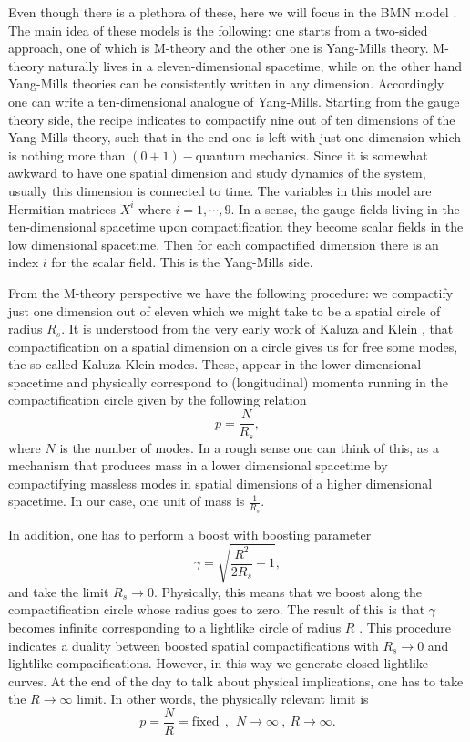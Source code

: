 \documentclass[11pt,english]{article}
\newcommand{\be}{\begin{equation}}
\newcommand{\ee}{\end{equation}}
\def\nn{\nonumber}
\numberwithin{equation}{section}
\begin{document}
Even though there is a plethora of these, here we will focus in the BMN model \cite{Berenstein2002}. The main idea of these models is the following: one starts from a two-sided approach, one of which is M-theory and the other one is Yang-Mills theory. M-theory naturally lives in a eleven-dimensional spacetime, while on the other hand Yang-Mills theories can be consistently written in any dimension. Accordingly one can write a ten-dimensional analogue of Yang-Mills. Starting from the gauge theory side, the recipe indicates to compactify nine out of ten dimensions of the Yang-Mills theory, such that in the end one is left with just one dimension which is nothing more than $(0+1)-$quantum mechanics. Since it is somewhat awkward to have one spatial dimension and study dynamics of the system, usually this dimension is connected to time.  The variables in this model are Hermitian matrices $X^i$ where $i=1,\cdots,9$. In a sense, the gauge fields living in the ten-dimensional spacetime upon compactification they become scalar fields in the low dimensional spacetime. Then for each compactified dimension there is an index $i$ for the scalar field.  This is the Yang-Mills side. 

From the M-theory perspective we have the following procedure: we compactify just one dimension out of eleven which we might take to be a spatial circle of radius $R_s$. It is understood from the very early work of Kaluza \cite{Kaluza} and Klein \cite{Klein}, that compactification on a spatial dimension on a circle gives us for free some modes, the so-called Kaluza-Klein modes. These, appear in the lower dimensional spacetime and physically correspond to (longitudinal) momenta running in the compactification circle given by the following relation
\be\nn 
p=\frac{N}{R_s},
\ee   
where $N$ is the number of modes. In a rough sense one can think of this, as a mechanism that produces mass in a lower dimensional spacetime by compactifying massless modes in spatial dimensions of a higher dimensional spacetime. In our case, one unit of mass is $\frac{1}{R_s}$.

In addition, one has to perform a boost with boosting parameter 
\be 
\gamma=\sqrt{\frac{R^2}{2R_s}+1},
\ee
and take the limit $R_s\to 0$. Physically, this means that we boost along the compactification circle whose radius goes to zero.  The result of this is that $\gamma$ becomes infinite corresponding to a lightlike circle of radius $R$ \cite{Seiberg1997}. This procedure indicates a duality between boosted spatial compactifications with $R_s\to 0$ and lightlike compacifications.  However, in this way we generate closed lightlike curves. At the end of the day to talk about physical implications, one has to take the $R\to \infty$ limit. In other words, the physically relevant limit is 
\be 
p=\frac{N}{R}=\text{fixed}~~,~~N\to \infty~,~ R\to\infty.
\ee 
\end{document}

